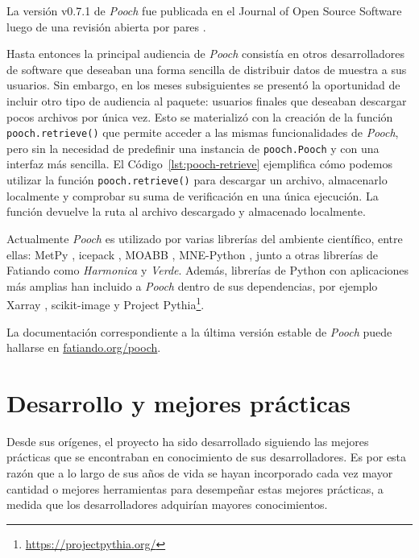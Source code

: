 La versión v0.7.1 de \emph{Pooch} fue publicada en el Journal of Open Source
Software luego de una revisión abierta por pares \citep{pooch2020}.



Hasta entonces la principal audiencia de \emph{Pooch} consistía en otros
desarrolladores de software que deseaban una forma sencilla de distribuir datos
de muestra a sus usuarios.
Sin embargo, en los meses subsiguientes se presentó la oportunidad de incluir
otro tipo de audiencia al paquete: usuarios finales que deseaban descargar
pocos archivos por única vez.
Esto se materializó con la creación de la función \texttt{pooch.retrieve()} que
permite acceder a las mismas funcionalidades de \emph{Pooch}, pero sin la
necesidad de predefinir una instancia de \texttt{pooch.Pooch} y con una
interfaz más sencilla.
El Código~\ref{lst:pooch-retrieve} ejemplifica cómo podemos utilizar la función
\texttt{pooch.retrieve()} para descargar un archivo, almacenarlo localmente
y comprobar su suma de verificación en una única ejecución.
La función devuelve la ruta al archivo descargado y almacenado localmente.

Actualmente \emph{Pooch} es utilizado por varias librerías del ambiente
científico, entre ellas: MetPy \citep{metpy}, icepack \citep{icepack}, MOABB
\citep{moabb}, MNE-Python \citep{mnepython}, junto a otras librerías de
Fatiando como \emph{Harmonica} y \emph{Verde}.
Además, librerías de Python con aplicaciones más amplias han incluido
a \emph{Pooch} dentro de sus dependencias, por ejemplo Xarray
\citep{xarray2017}, scikit-image \citep{skimage} y Project
Pythia\footnote{\url{https://projectpythia.org/}}.

La documentación correspondiente a la última versión estable de \emph{Pooch}
puede hallarse en \href{https://www.fatiando.org/pooch}{fatiando.org/pooch}.


\section{Desarrollo y mejores prácticas}
\label{sec:best-practices}

Desde sus orígenes, el proyecto ha sido desarrollado siguiendo las mejores
prácticas que se encontraban en conocimiento de sus desarrolladores.
Es por esta razón que a lo largo de sus años de vida se hayan incorporado cada
vez mayor cantidad o mejores herramientas para desempeñar estas mejores
prácticas, a medida que los desarrolladores adquirían mayores conocimientos.


